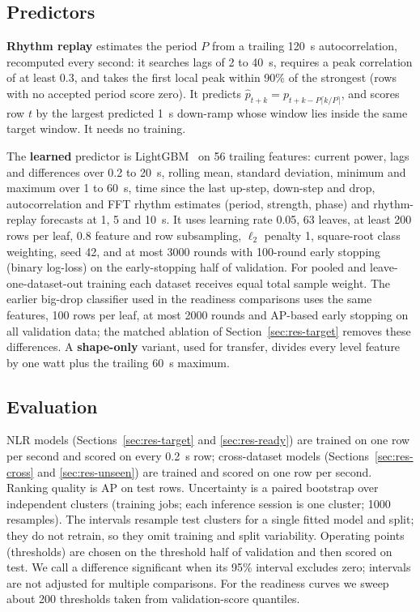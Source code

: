 \documentclass[11pt]{article}
\begin{document}
\subsection{Predictors}

\textbf{Rhythm replay} estimates the period $P$ from a trailing 120~s autocorrelation, recomputed every
second: it searches lags of 2 to 40~s, requires a peak correlation of at least 0.3, and takes the first
local peak within 90\% of the strongest (rows with no accepted period score zero). It predicts $\hat p_{t+k} = p_{t+k-P\lceil k/P\rceil}$, and scores row $t$ by the largest predicted
1~s down-ramp whose window lies inside the same target window. It needs no training.

The \textbf{learned} predictor is LightGBM~\cite{lightgbm} on 56 trailing features: current power, lags
and differences over 0.2 to 20~s, rolling mean, standard deviation, minimum and maximum over 1 to 60~s,
time since the last up-step, down-step and drop, autocorrelation and FFT rhythm estimates (period,
strength, phase) and rhythm-replay forecasts at 1, 5 and 10~s. It uses learning rate 0.05, 63 leaves,
at least 200 rows per leaf, 0.8 feature and row subsampling, $\ell_2$ penalty 1, square-root class
weighting, seed 42, and at most 3000 rounds with 100-round early stopping (binary log-loss) on the
early-stopping half of validation. For pooled and leave-one-dataset-out training each dataset receives
equal total sample weight. The earlier big-drop classifier used in the readiness comparisons uses the same
features, 100 rows per leaf, at most 2000 rounds and AP-based early stopping on all validation data; the
matched ablation of Section~\ref{sec:res-target} removes these differences. A \textbf{shape-only} variant, used for transfer, divides every level feature by one watt plus the
trailing 60~s maximum.

\subsection{Evaluation}

NLR models (Sections~\ref{sec:res-target} and \ref{sec:res-ready}) are trained on one row per second
and scored on every 0.2~s row; cross-dataset models (Sections~\ref{sec:res-cross} and
\ref{sec:res-unseen}) are trained and scored on one row per second. Ranking quality is AP on
test rows. Uncertainty is a paired bootstrap over independent clusters
(training jobs; each inference session is one cluster; 1000 resamples). The intervals resample test
clusters for a single fitted model and split; they do not retrain, so they omit training and split
variability. Operating points (thresholds) are chosen on the threshold half of validation and then
scored on test. We call a difference significant when its 95\% interval excludes zero; intervals are
not adjusted for multiple comparisons. For the readiness curves we sweep about 200 thresholds taken from validation-score
quantiles.
\end{document}

